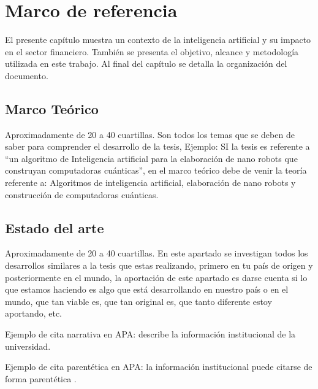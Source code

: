 \chapter{Marco de referencia}\label{Cap_01}
\lettrine[lines=2,nindent=0pt]{E}{}l presente capítulo muestra un contexto de la inteligencia artificial y su impacto en el sector financiero. También se presenta el objetivo, alcance y metodología utilizada en este trabajo. Al final del capítulo se detalla la organización del documento.

\section{Marco Teórico}
Aproximadamente de 20 a 40 cuartillas. Son todos los temas que se deben de saber para comprender el desarrollo de la tesis, Ejemplo: SI la tesis es referente a “un algoritmo de Inteligencia artificial para la elaboración de nano robots que construyan computadoras cuánticas”, en el marco teórico debe de venir la teoría referente a: Algoritmos de inteligencia artificial, elaboración de nano robots y construcción de computadoras cuánticas.

\section{Estado del arte}
Aproximadamente de 20 a 40 cuartillas. En este apartado se investigan todos los desarrollos similares a la tesis que estas realizando, primero en tu país de origen y posteriormente en el mundo, la aportación de este apartado es darse cuenta si lo que estamos haciendo es algo que está desarrollando en nuestro país o en el mundo, que tan viable es, que tan original es, que tanto diferente estoy aportando, etc.

Ejemplo de cita narrativa en APA: \textcite{unade2025} describe la información institucional de la universidad.

Ejemplo de cita parentética en APA: la información institucional puede citarse de forma parentética \parencite{unade2025}.

\lipsum[1-10] %
